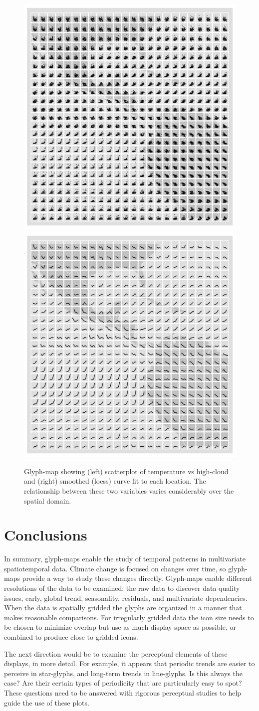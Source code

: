 \documentclass[oneside]{article}
\begin{document}
\begin{figure}[htbp]
  \centering
  \includegraphics[width=0.5\linewidth]{nasa-scat-glyph}%
  \includegraphics[width=0.5\linewidth]{nasa-loess-glyph}

  \caption{Glyph-map showing (left) scatterplot of temperature vs high-cloud and (right) smoothed (loess) curve fit to each location. The relationship between these two variables varies considerably over the spatial domain. }
  \label{fig:cloud}
\end{figure}

\section{Conclusions}

In summary, glyph-maps enable the study of temporal patterns in multivariate spatiotemporal data. Climate change is focused on changes over time, so glyph-maps provide a way to study these changes directly. Glyph-maps enable different resolutions of the data to be examined: the raw data to discover data quality issues, early, global trend, seasonality, residuals, and multivariate dependencies. When the data is spatially gridded the glyphs are organized in a manner that makes reasonable comparisons. For irregularly gridded data the icon size needs to be chosen to minimize overlap but use as much display space as possible, or combined to produce close to gridded icons. 

The next direction would be to examine the perceptual elements of these displays, in more detail. For example, it appears that periodic trends are easier to perceive in star-glyphs, and long-term trends in line-glyphs. Is this always the case? Are their certain types of periodicity that are particularly easy to spot? These questions need to be answered with rigorous perceptual studies to help guide the use of these plots.


\end{document}
